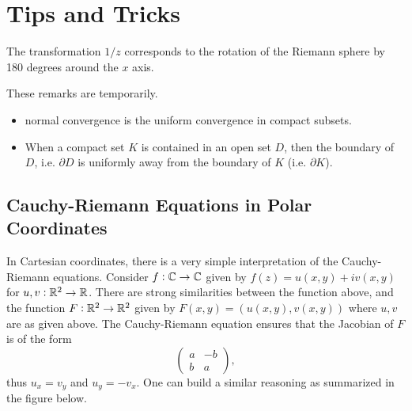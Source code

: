 \chapter{Tips and Tricks}


\begin{observation}
	The transformation $ 1/z $ corresponds to the rotation of the Riemann sphere by 180 degrees around the $ x $ axis.
\end{observation}


\begin{remark}
	These remarks are temporarily.
	\begin{itemize}
		\item normal convergence is the uniform convergence in compact subsets.
		\item When a compact set $ K $ is contained in an open set $ D $, then the boundary of $ D $, i.e. $ \partial D $ is uniformly away from the boundary of $ K $ (i.e. $ \partial K $).
	\end{itemize}
\end{remark}


\section{Cauchy-Riemann Equations in Polar Coordinates}
In Cartesian coordinates, there is a very simple interpretation of the Cauchy-Riemann equations. Consider $ f:\mathbb{C}\to \mathbb{C} $ given by $ f(z) = u(x,y) + iv(x,y) $ for $ u,v:\mathbb{R}^2\to\mathbb{R} $. There are strong similarities between the function above, and the function $ F:\mathbb{R}^2\to\mathbb{R}^2 $ given by $ F(x,y) = (u(x,y),v(x,y)) $ where $ u,v $ are as given above. The Cauchy-Riemann equation ensures that the Jacobian of $ F $ is of the form
 \[ \begin{pmatrix}
 	a  & -b \\
 	b & a
 \end{pmatrix}, \]
 thus $ u_x = v_y $ and $ u_y = -v_x $. One can build a similar reasoning as summarized in the figure below.
 
 \FloatBarrier
 
 
 
